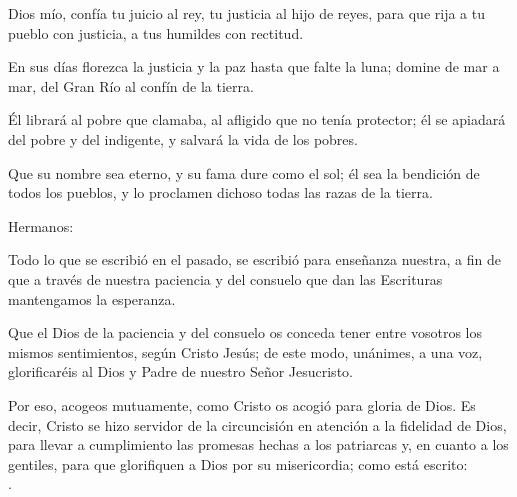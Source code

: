 
\begin{psbody}
	Dios mío, confía tu juicio al rey, 
	tu justicia al hijo de reyes, 
	para que rija a tu pueblo con justicia, 
	a tus humildes con rectitud.
	
	En sus días florezca la justicia 
	y la paz hasta que falte la luna; 
	domine de mar a mar, 
	del Gran Río al confín de la tierra. 
	
	Él librará al pobre que clamaba, 
	al afligido que no tenía protector; 
	él se apiadará del pobre y del indigente, 
	y salvará la vida de los pobres. 
	
	Que su nombre sea eterno, 
	y su fama dure como el sol; 
	él sea la bendición de todos los pueblos, 
	y lo proclamen dichoso todas las razas de la tierra.
\end{psbody}


 


\begin{scripture}
	Hermanos: 
	
	Todo lo que se escribió en el pasado, se escribió para enseñanza nuestra, a fin de que a través de nuestra paciencia y del consuelo que dan las Escrituras mantengamos la esperanza. 
	
	Que el Dios de la paciencia y del consuelo os conceda tener entre vosotros los mismos sentimientos, según Cristo Jesús; de este modo, unánimes, a una voz, glorificaréis al Dios y Padre de nuestro Señor Jesucristo. 
	
	Por eso, acogeos mutuamente, como Cristo os acogió para gloria de Dios. Es decir, Cristo se hizo servidor de la circuncisión en atención a la fidelidad de Dios, para llevar a cumplimiento las promesas hechas a los patriarcas y, en cuanto a los gentiles, para que glorifiquen a Dios por su misericordia; como está escrito: \\ .
\end{scripture}


 



